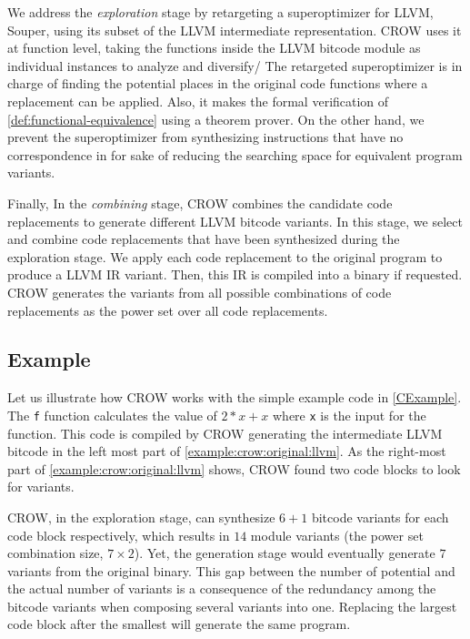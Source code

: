 We address the \emph{exploration} stage  by retargeting a  superoptimizer for  LLVM, Souper, using its subset of the LLVM intermediate representation. CROW uses it at function level, taking the functions inside the LLVM bitcode module as individual instances to analyze and diversify/ The retargeted superoptimizer is in charge of finding the potential places in the original code functions where a replacement can be applied. Also, it makes the formal verification of \autoref{def:functional-equivalence} using a theorem prover. 
On the other hand, we prevent the superoptimizer from synthesizing instructions that have no correspondence in \wasm for sake of reducing the searching space for equivalent program variants.


Finally, In the \emph{combining} stage, CROW combines the candidate code replacements to generate different LLVM bitcode variants. In this stage, we select and combine code replacements that have been synthesized during the exploration stage. We apply each code replacement to the original program to produce a LLVM IR variant.
Then, this IR is compiled into a \wasm binary if requested. CROW generates the variants from all possible combinations of code replacements as the power set over all code replacements.  

\subsection{Example}
\label{section:crow:example}
 Let us illustrate how CROW works with the simple example code in \autoref{CExample}. The \texttt{f} function calculates the value of $2 * x + x$ where \texttt{x} is the input for the function.  This code is compiled by CROW generating the intermediate LLVM bitcode in the left most part of \autoref{example:crow:original:llvm}. As the right-most part of \autoref{example:crow:original:llvm} shows, CROW found two code blocks to look for variants.  


    

CROW, in the exploration stage, can synthesize $6 + 1$ bitcode variants for each code block respectively, which results in $14$ module variants (the power set combination size, $7\times2$). Yet, the generation stage would eventually generate $7$ variants from the original \wasm binary. This gap between the number of potential and the actual number of variants is a consequence of the redundancy among the bitcode variants when composing several variants into one. Replacing the largest code block after the smallest will generate the same program. 


